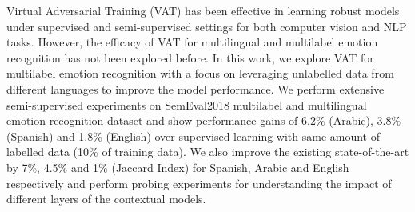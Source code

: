Virtual Adversarial Training (VAT) has been effective in learning robust models under supervised and semi-supervised settings for both computer vision and NLP tasks. However, the efficacy of VAT for multilingual and multilabel emotion recognition has not been explored before. In this work, we explore VAT for multilabel emotion recognition with a focus on leveraging unlabelled data from different languages to improve the model performance. We perform extensive semi-supervised experiments on SemEval2018 multilabel and multilingual emotion recognition dataset and show performance gains of 6.2\% (Arabic), 3.8\% (Spanish) and 1.8\% (English) over supervised learning with same amount of labelled data (10\% of training data). We also improve the existing state-of-the-art by 7\%, 4.5\% and 1\% (Jaccard Index) for Spanish, Arabic and English respectively and perform probing experiments for understanding the impact of different layers of the contextual models.
